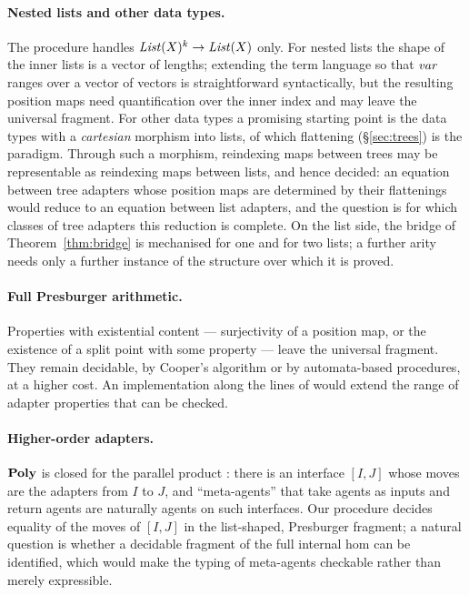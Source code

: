 \documentclass{fundam}
\begin{document}
\paragraph{Nested lists and other data types.}  The procedure handles
$\mathit{List}(X)^k \to \mathit{List}(X)$ only.  For nested lists the shape of the inner lists is a vector
of lengths; extending the term language so that $\mathit{var}$ ranges over a vector of
vectors is straightforward syntactically, but the resulting position maps need
quantification over the inner index and may leave the universal fragment.  For other data
types a promising starting point is the data types with a \emph{cartesian} morphism into
lists, of which flattening (\S\ref{sec:trees}) is the paradigm.  Through such a morphism,
reindexing maps between trees may be representable as reindexing maps between lists, and
hence decided: an equation between tree adapters whose position maps are determined by
their flattenings would reduce to an equation between list adapters, and the question is
for which classes of tree adapters this reduction is complete.  On the list side, the
bridge of Theorem~\ref{thm:bridge} is mechanised for one and for two lists; a further
arity needs only a further instance of the structure over which it is proved.

\paragraph{Full Presburger arithmetic.}  Properties with existential content ---
surjectivity of a position map, or the existence of a split point with some property ---
leave the universal fragment.  They remain decidable, by Cooper's algorithm
\cite{Cooper72} or by automata-based procedures, at a higher cost.  An implementation along the lines of
\cite{HabermehlIosifVojnar08} would extend the range of adapter properties that can be
checked.

\paragraph{Higher-order adapters.}  $\mathbf{Poly}$ is closed for the parallel product
\cite{NiuSpivak25}: there is an interface $[I, J]$ whose moves are the adapters from $I$
to $J$, and ``meta-agents'' that take agents as inputs and return agents
\cite{KodamaiEEJ26,GhaniPodcast26} are naturally agents on such interfaces.  Our procedure
decides equality of the moves of $[I, J]$ in the list-shaped, Presburger fragment; a
natural question is whether a decidable fragment of the full internal hom can be
identified, which would make the typing of meta-agents checkable rather than merely
expressible.
\end{document}
